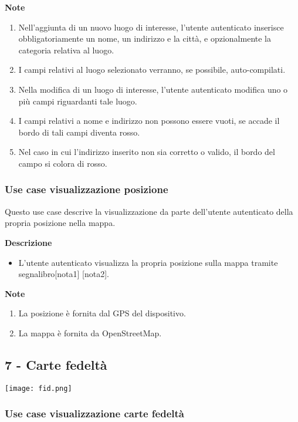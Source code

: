 \documentclass[a4paper,12pt]{article}
\begin{document}
\textbf{Note}
\begin{enumerate} \setlength\itemsep{0.01em}
\item Nell'aggiunta di un nuovo luogo di interesse, l'utente autenticato inserisce obbligatoriamente un nome, un indirizzo e la città, e opzionalmente la categoria relativa al luogo.
\item I campi relativi al luogo selezionato verranno, se possibile, auto-compilati.
\item Nella modifica di un luogo di interesse, l'utente autenticato modifica uno o più campi riguardanti tale luogo.
\item I campi relativi a nome e indirizzo non possono essere vuoti, se accade il bordo di tali campi diventa rosso.
\item Nel caso in cui l'indirizzo inserito non sia corretto o valido, il bordo del campo si colora di rosso.
\end{enumerate}


\subsubsection*{Use case visualizzazione posizione}

Questo use case descrive la visualizzazione da parte dell'utente autenticato della propria posizione nella mappa.

\textbf{Descrizione}
\begin{itemize} \setlength\itemsep{0.01em}
\item L'utente autenticato visualizza la propria posizione sulla mappa tramite segnalibro[nota1] [nota2].
\end{itemize}

\textbf{Note}
\begin{enumerate} \setlength\itemsep{0.01em}
\item La posizione è fornita dal GPS del dispositivo.
\item La mappa è fornita da OpenStreetMap.
\end{enumerate}


\subsection*{7 - Carte fedeltà}

\begin{center}
  \texttt{[image: fid.png]}
\end{center}
\subsubsection*{Use case visualizzazione carte fedeltà}
\end{document}
